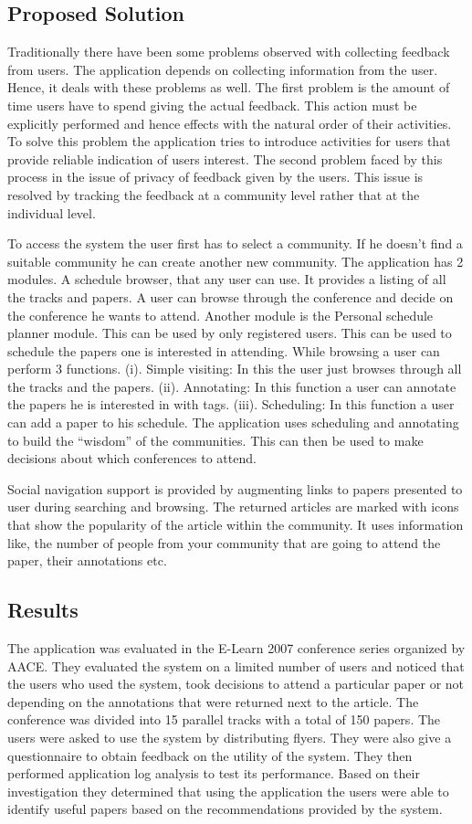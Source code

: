 \documentclass[12pt, onecolumn]{IEEEtran}
\begin{document}
\subsection{Proposed Solution}
Traditionally there have been some problems observed with collecting feedback
from users. The application depends on collecting information from the user.
Hence, it deals with these problems as well. The first problem is the amount of
time users have to spend giving the actual feedback. This action must be
explicitly performed and hence effects with the natural order of their
activities. To solve this problem the application tries to introduce activities
for users that provide reliable indication of users interest. The second
problem faced by this process in the issue of privacy of feedback given by the
users. This issue is resolved by tracking the feedback at a community level
rather that at the individual level. 

To access the system the user first has to select a community. If he doesn't find
a suitable community he can create another new community. The application has 2
modules. A schedule browser, that any user can use. It provides a listing of all
the tracks and papers. A user can browse through the conference and decide on
the conference he wants to attend. Another module is the Personal schedule
planner module. This can be used by only registered users. This can be used to
schedule the papers one is  interested in attending. While browsing a user can
perform 3 functions. (i). Simple visiting: In this the user just browses
through all the tracks and the papers. (ii). Annotating: In this function a
user can annotate the papers he is interested in with tags. (iii). Scheduling:
In this function a user can add a paper to his schedule. The application uses
scheduling and annotating to build the ``wisdom'' of the communities. This can
then be used to make decisions about which conferences to attend.

Social navigation support is provided by augmenting links to papers presented
to user during searching and browsing. The returned articles are marked with
icons that show the popularity of the article within the community. It uses
information like, the number of people from your community that are going to
attend the paper, their annotations etc.

\subsection{Results}
The application was evaluated in the E-Learn 2007 conference series organized by
AACE. They evaluated the system on a limited number of users and noticed that the
users who used the system, took decisions to attend a particular paper or not
depending on the annotations that were returned next to the article. The
conference was divided into 15 parallel tracks with a total of 150 papers. The
users were asked to use the system by distributing flyers. They were also give a
questionnaire to obtain feedback on the utility of the system. They then
performed application log analysis to test its performance. Based on their
investigation they determined that using the application the users were able to
identify useful papers based on the recommendations provided by the system.
\end{document}
